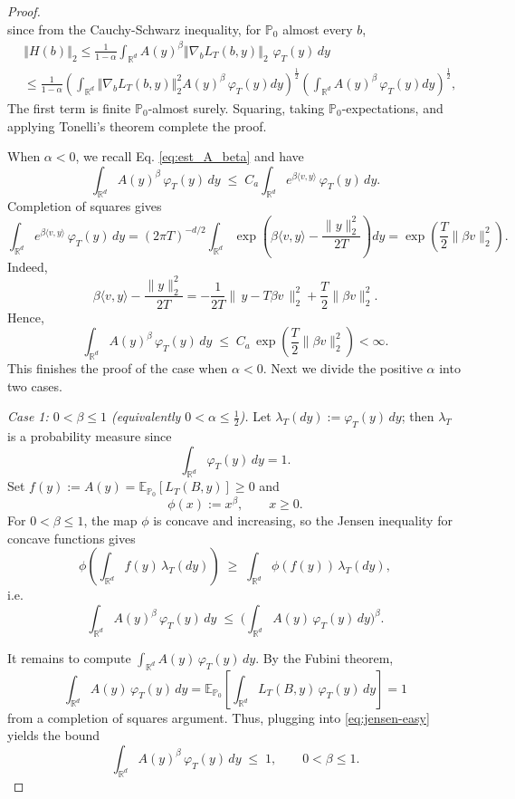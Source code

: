 \documentclass[10pt,a4paper]{amsart}
\newcommand{\E}{\mathbb{E}}
\newcommand{\R}{\mathbb{R}}
\begin{document}
\begin{proof}
\begin{equation}
\end{equation}since from the Cauchy-Schwarz inequality, for $\mathbb{P}_0$ almost every $b$,
\begin{align*}
    &\left\Vert H(b) \right\Vert_2 \leq \frac{1}{1-\alpha}\int_{\mathbb R^d}A(y)^{\beta}\left\Vert\nabla_b L_T(b,y)\right\Vert_2\,\,\varphi_T(y)\,dy\\
    &\leq \frac{1}{1-\alpha} \left(\int_{\mathbb{R}^d}\left\Vert\nabla_b L_T(b,y)\right\Vert_2^2A(y)^{\beta}\,\varphi_T(y)dy\right)^{\frac{1}{2}}\left(\int_{\mathbb{R}^d}A(y)^{\beta}\,\varphi_T(y)dy\right)^{\frac{1}{2}},
\end{align*}
{The first term is finite $\mathbb P_0$-almost surely. Squaring, taking
$\mathbb P_0$-expectations, and applying Tonelli's theorem complete the proof.}

When $\alpha < 0$, we recall Eq. \eqref{eq:est_A_beta} and have %
\[
\int_{\R^d} A(y)^{\beta}\,\varphi_T(y)\,dy
\;\le\;
C_a \int_{\R^d} e^{\beta\langle v,y\rangle}\,\varphi_T(y)\,dy.
\]
Completion of squares gives
\[
\int_{\R^d} e^{\beta\langle v,y\rangle}\,\varphi_T(y)\,dy
=(2\pi T)^{-d/2}\!\!\int_{\R^d}
\exp\!\left(\beta\langle v,y\rangle-\frac{\|y\|_2^2}{2T}\right)dy
=\exp\!\left(\frac{T}{2}\|\beta v\|_2^2\right).
\]
Indeed,
\[
\beta\langle v,y\rangle-\frac{\|y\|_2^2}{2T}
=-\frac{1}{2T}\Big\|\,y-T\beta v\,\Big\|_2^2+\frac{T}{2}\|\beta v\|_2^2.
\]
Hence, 
\[
\int_{\R^d} A(y)^{\beta}\,\varphi_T(y)\,dy
\;\le\;
C_a\,\exp\!\left(\frac{T}{2}\|\beta v\|_2^2\right)
<\infty.
\]
This finishes the proof of the case when $\alpha<0$.
Next we divide the positive $\alpha$ into two cases.

\noindent\emph{Case 1: $0<\beta\le 1$ (equivalently $0<\alpha\le \tfrac12$).}
Let $\lambda_T(dy):=\varphi_T(y)\,dy$; then $\lambda_T$ is a probability measure since
\[
\int_{\R^d}\varphi_T(y)\,dy=1.
\]
Set $f(y):=A(y)=\E_{\mathbb P_0}[L_T(B,y)]\geq0$ and
\[
\phi(x):=x^{\beta},\qquad x\ge 0.
\]
For $0<\beta\le 1$, the map $\phi$ is concave and increasing, so the Jensen 
inequality for concave functions gives
\[
\phi\!\left(\int_{\R^d} f(y)\,\lambda_T(dy)\right)\;\ge\;\int_{\R^d}\phi(f(y))\,\lambda_T(dy),
\]
i.e.
\begin{equation}\label{eq:jensen-easy}
\int_{\R^d} A(y)^{\beta}\,\varphi_T(y)\,dy
\;\le\;
\Big(\int_{\R^d} A(y)\,\varphi_T(y)\,dy\Big)^{\beta}.
\end{equation}

It remains to compute $\int_{\R^d} A(y)\,\varphi_T(y)\,dy$. By the Fubini theorem,
\[
\int_{\R^d} A(y)\,\varphi_T(y)\,dy
=\E_{\mathbb{P}_0}\!\left[\int_{\R^d} L_T(B,y)\,\varphi_T(y)\,dy\right] = 1
\]
from a completion of squares argument. Thus, plugging into \eqref{eq:jensen-easy} yields the bound
\[\ \int_{\R^d} A(y)^{\beta}\,\varphi_T(y)\,dy \;\le\; 1,\qquad 0<\beta\le 1. \ 
\]


\end{proof}
\end{document}
